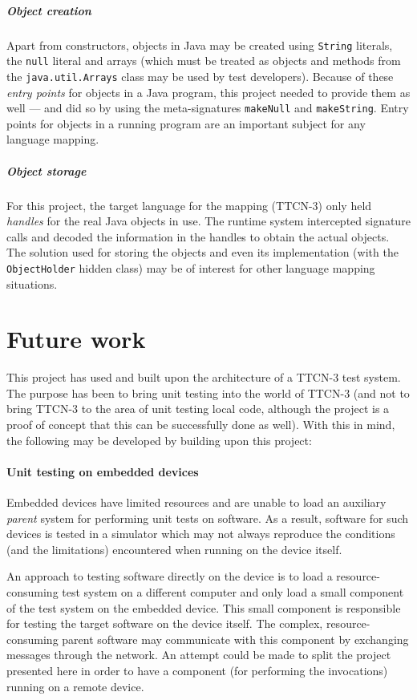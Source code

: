 \subparagraph{Object creation}
Apart from constructors, objects in Java may be created using
\verb=String= literals, the \verb=null= literal and arrays
(which must be treated as objects
and methods from the \verb=java.util.Arrays= class
may be used by test developers).
Because of these \emph{entry points} for objects in a Java program,
this project needed to provide them as well ---
and did so by using the meta-signatures \verb=makeNull= and \verb=makeString=.
Entry points for objects in a running program are an important subject
for any language mapping.

\subparagraph{Object storage}
For this project, the target language for the mapping (\ac{TTCN-3})
only held \emph{handles} for the real Java objects in use.
The runtime system intercepted signature calls and
decoded the information in the handles to obtain the actual objects.
The solution used for storing the objects and even its implementation
(with the \verb=ObjectHolder= hidden class)
may be of interest for other language mapping situations.


\section{Future work}
\label{sec:future-work}

This project has used and built upon
the architecture of a \ac{TTCN-3} test system.
The purpose has been to bring unit testing into the world of \ac{TTCN-3}
(and not to bring \ac{TTCN-3} to the area of unit testing local code,
although the project is a proof of concept
that this can be successfully done as well).
With this in mind, the following may be developed
by building upon this project:

\paragraph{Unit testing on embedded devices}
Embedded devices have limited resources
and are unable to load an auxiliary \emph{parent} system for
performing unit tests on software.
As a result, software for such devices is tested in a simulator
which may not always reproduce the conditions (and the limitations)
encountered when running on the device itself.

An approach to testing software directly on the device
is to load a resource-consuming test system on a different computer
and only load a small component of the test system on the embedded device.
This small component is responsible for
testing the target software on the device itself.
The complex, resource-consuming parent software
may communicate with this component
by exchanging messages through the network.
An attempt could be made to split the project presented here
in order to have a component (for performing the invocations)
running on a remote device.

